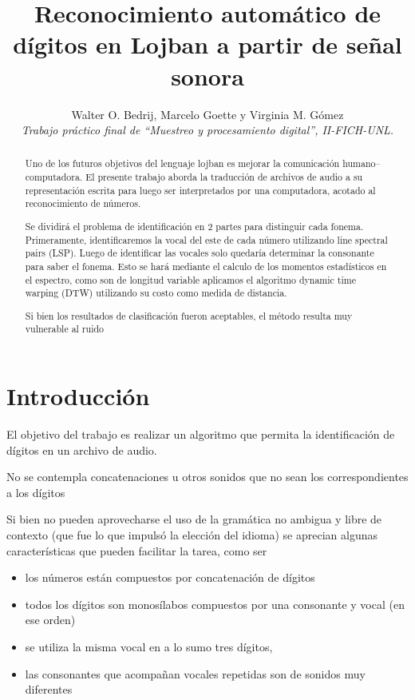 \documentclass[conference,a4paper,10pt,oneside,final]{tfmpd}
\begin{document}
\title{Reconocimiento automático de dígitos en Lojban a partir de señal sonora}

\author{Walter O. Bedrij,
        Marcelo Goette y 
        Virginia M. Gómez \\
\textit{Trabajo práctico final de ``Muestreo y procesamiento digital'', II-FICH-UNL.}}



\maketitle
\begin{abstract}
	Uno de los futuros objetivos del lenguaje lojban es mejorar la
	comunicación humano--computadora.  El presente trabajo aborda
	la traducción de archivos de audio a su representación escrita
	para luego ser interpretados por una computadora, acotado al
	reconocimiento de números.


	Se dividirá el problema de identificación en 2 partes para
	distinguir cada fonema.  Primeramente, identificaremos la vocal
	del este de cada número utilizando line spectral pairs (LSP).
	Luego de identificar las vocales solo quedaría determinar la
	consonante para saber el fonema. 
	Esto se hará mediante el calculo de los momentos estadísticos en el espectro,
	como son de longitud variable aplicamos el algoritmo dynamic time warping (DTW)
	utilizando su costo como medida de distancia.


	Si bien los resultados de clasificación fueron aceptables,
	el método resulta muy vulnerable al ruido

\end{abstract}


\section{Introducción}
	El objetivo del trabajo es realizar un algoritmo que permita la identificación de dígitos
	en un archivo de audio.

	No se contempla concatenaciones u otros sonidos que no sean los correspondientes a los dígitos

	Si bien no pueden aprovecharse el uso de la gramática
	no ambigua y libre de contexto (que fue lo que impulsó la
	elección del idioma) se aprecian algunas características que
	pueden facilitar la tarea, como ser
	\begin{itemize}\itemsep0pt
	\item los números están compuestos por concatenación de dígitos
	\item todos los dígitos son monosílabos compuestos por una consonante y vocal
		(en ese orden)
	\item se utiliza la misma vocal en a lo sumo tres dígitos,
	\item las consonantes que acompañan vocales repetidas son de sonidos muy diferentes
	\end{itemize}
\end{document}
